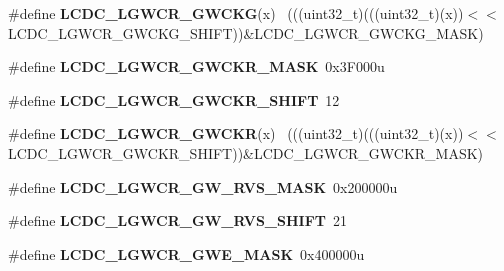 \begin{DoxyCompactItemize}
\item 
\hypertarget{group___l_c_d_c___register___masks_ga3cbccfbf532f9377504c3c20762e87e0}{}\#define {\bfseries L\+C\+D\+C\+\_\+\+L\+G\+W\+C\+R\+\_\+\+G\+W\+C\+K\+G}(x)                                        ~(((uint32\+\_\+t)(((uint32\+\_\+t)(x))$<$$<$L\+C\+D\+C\+\_\+\+L\+G\+W\+C\+R\+\_\+\+G\+W\+C\+K\+G\+\_\+\+S\+H\+I\+F\+T))\&L\+C\+D\+C\+\_\+\+L\+G\+W\+C\+R\+\_\+\+G\+W\+C\+K\+G\+\_\+\+M\+A\+S\+K)\label{group___l_c_d_c___register___masks_ga3cbccfbf532f9377504c3c20762e87e0}

\item 
\hypertarget{group___l_c_d_c___register___masks_ga9f370726b88e6a82c99d27c05104dd56}{}\#define {\bfseries L\+C\+D\+C\+\_\+\+L\+G\+W\+C\+R\+\_\+\+G\+W\+C\+K\+R\+\_\+\+M\+A\+S\+K}~0x3\+F000u\label{group___l_c_d_c___register___masks_ga9f370726b88e6a82c99d27c05104dd56}

\item 
\hypertarget{group___l_c_d_c___register___masks_gab5a74bf8e7f3a94e3a59125e0668f823}{}\#define {\bfseries L\+C\+D\+C\+\_\+\+L\+G\+W\+C\+R\+\_\+\+G\+W\+C\+K\+R\+\_\+\+S\+H\+I\+F\+T}~12\label{group___l_c_d_c___register___masks_gab5a74bf8e7f3a94e3a59125e0668f823}

\item 
\hypertarget{group___l_c_d_c___register___masks_gaeef14aaaffa083036377870858b95010}{}\#define {\bfseries L\+C\+D\+C\+\_\+\+L\+G\+W\+C\+R\+\_\+\+G\+W\+C\+K\+R}(x)                                        ~(((uint32\+\_\+t)(((uint32\+\_\+t)(x))$<$$<$L\+C\+D\+C\+\_\+\+L\+G\+W\+C\+R\+\_\+\+G\+W\+C\+K\+R\+\_\+\+S\+H\+I\+F\+T))\&L\+C\+D\+C\+\_\+\+L\+G\+W\+C\+R\+\_\+\+G\+W\+C\+K\+R\+\_\+\+M\+A\+S\+K)\label{group___l_c_d_c___register___masks_gaeef14aaaffa083036377870858b95010}

\item 
\hypertarget{group___l_c_d_c___register___masks_ga53fe4db400fafdf0295eaf2de2381f70}{}\#define {\bfseries L\+C\+D\+C\+\_\+\+L\+G\+W\+C\+R\+\_\+\+G\+W\+\_\+\+R\+V\+S\+\_\+\+M\+A\+S\+K}~0x200000u\label{group___l_c_d_c___register___masks_ga53fe4db400fafdf0295eaf2de2381f70}

\item 
\hypertarget{group___l_c_d_c___register___masks_ga7e8f5454d08880caea42b5e4119a7b2d}{}\#define {\bfseries L\+C\+D\+C\+\_\+\+L\+G\+W\+C\+R\+\_\+\+G\+W\+\_\+\+R\+V\+S\+\_\+\+S\+H\+I\+F\+T}~21\label{group___l_c_d_c___register___masks_ga7e8f5454d08880caea42b5e4119a7b2d}

\item 
\hypertarget{group___l_c_d_c___register___masks_ga5f55fbbc5360dc16d02b0810ea74e4ea}{}\#define {\bfseries L\+C\+D\+C\+\_\+\+L\+G\+W\+C\+R\+\_\+\+G\+W\+E\+\_\+\+M\+A\+S\+K}~0x400000u\label{group___l_c_d_c___register___masks_ga5f55fbbc5360dc16d02b0810ea74e4ea}


\end{DoxyCompactItemize}
